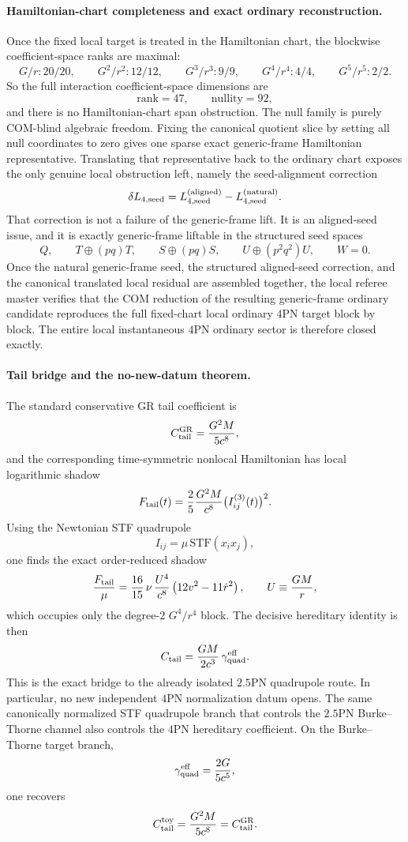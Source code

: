 \documentclass[11pt]{article}
\begin{document}
\paragraph{Hamiltonian-chart completeness and exact ordinary reconstruction.}
Once the fixed local target is treated in the Hamiltonian chart, the blockwise
coefficient-space ranks are maximal:
\[
G/r:20/20,
\qquad
G^2/r^2:12/12,
\qquad
G^3/r^3:9/9,
\qquad
G^4/r^4:4/4,
\qquad
G^5/r^5:2/2.
\]
So the full interaction coefficient-space dimensions are
\[
\text{rank}=47,
\qquad
\text{nullity}=92,
\]
and there is no Hamiltonian-chart span obstruction.  The null family is purely
COM-blind algebraic freedom.  Fixing the canonical quotient slice by setting all
null coordinates to zero gives one sparse exact generic-frame Hamiltonian
representative.  Translating that representative back to the ordinary chart
exposes the only genuine local obstruction left, namely the seed-alignment
correction
\[
\delta L_{4,\rm seed}
=
L_{4,\rm seed}^{(\rm aligned)}-L_{4,\rm seed}^{(\rm natural)}.
\]
That correction is not a failure of the generic-frame lift.  It is an aligned-seed
issue, and it is exactly generic-frame liftable in the structured seed spaces
\[
Q,
\qquad
T\oplus(pq)T,
\qquad
S\oplus(pq)S,
\qquad
U\oplus(p^2q^2)U,
\qquad
W=0.
\]
Once the natural generic-frame seed, the structured aligned-seed correction, and
the canonical translated local residual are assembled together, the local
referee master verifies that the COM reduction of the resulting generic-frame
ordinary candidate reproduces the full fixed-chart local ordinary $4$PN target
block by block.  The entire local instantaneous $4$PN ordinary sector is
therefore closed exactly.

\paragraph{Tail bridge and the no-new-datum theorem.}
The standard conservative GR tail coefficient is
\[
C_{\rm tail}^{\rm GR}=\frac{G^2M}{5c^8},
\]
and the corresponding time-symmetric nonlocal Hamiltonian has local logarithmic
shadow
\[
F_{\rm tail}(t)=\frac{2}{5}\frac{G^2M}{c^8}\bigl(I_{ij}^{(3)}(t)\bigr)^2.
\]
Using the Newtonian STF quadrupole
\[
I_{ij}=\mu\,\mathrm{STF}(x_i x_j),
\]
one finds the exact order-reduced shadow
\[
\frac{F_{\rm tail}}{\mu}
=
\frac{16}{15}\,\nu\,\frac{U^4}{c^8}
\left(12v^2-11\dot r^2\right),
\qquad
U\equiv\frac{GM}{r},
\]
which occupies only the degree-$2$ $G^4/r^4$ block.  The decisive hereditary
identity is then
\[
C_{\rm tail}=\frac{GM}{2c^3}\,\gamma_{\rm quad}^{\rm eff}.
\]
This is the exact bridge to the already isolated $2.5$PN quadrupole route.  In
particular, no new independent $4$PN normalization datum opens.  The same
canonically normalized STF quadrupole branch that controls the $2.5$PN
Burke--Thorne channel also controls the $4$PN hereditary coefficient.  On the
Burke--Thorne target branch,
\[
\gamma_{\rm quad}^{\rm eff}=\frac{2G}{5c^5},
\]
one recovers
\[
C_{\rm tail}^{\rm toy}=\frac{G^2M}{5c^8}=C_{\rm tail}^{\rm GR}.
\]
\end{document}
